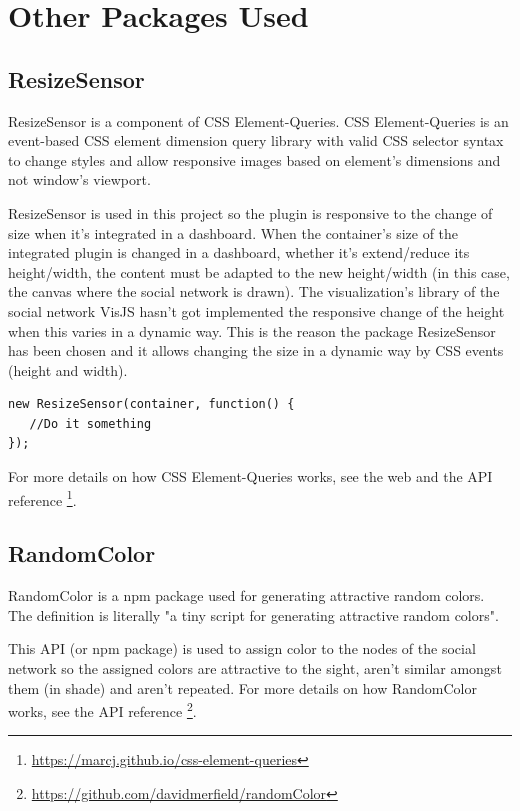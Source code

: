 \documentclass[a4paper, 12pt]{book}
\begin{document}
\section{Other Packages Used}
\label{sec:otherspackage}
\subsection{ResizeSensor}
ResizeSensor is a component of CSS Element-Queries. CSS Element-Queries is an event-based CSS element dimension query library with valid CSS selector syntax to change styles and allow responsive images based on element's dimensions and not window's viewport.

ResizeSensor is used in this project so the plugin is responsive to the change of size when it’s integrated in a dashboard. When the container’s size of the integrated plugin is changed in a dashboard, whether it’s extend/reduce its height/width, the content must be adapted to the new height/width (in this case, the canvas where the social network is drawn). The visualization’s library of the social network VisJS hasn’t got implemented the responsive change of the height when this varies in a dynamic way. This is the reason the package ResizeSensor has been chosen and it allows changing the size in a dynamic way by CSS events (height and width).

\begin{lstlisting}[frame=single]
new ResizeSensor(container, function() {
   //Do it something
});
\end{lstlisting}

For more details on how CSS Element-Queries works, see the web and the API reference \footnote{\url{https://marcj.github.io/css-element-queries}}.

\subsection{RandomColor}

RandomColor is a npm package used for generating attractive random colors. The definition is literally "a tiny script for generating attractive random colors". 

This API (or npm package) is used to assign color to the nodes of the social network so the assigned colors are attractive to the sight, aren’t similar amongst them (in shade) and aren’t repeated. For more details on how RandomColor works, see the API reference \footnote{\url{https://github.com/davidmerfield/randomColor}}.
\end{document}
